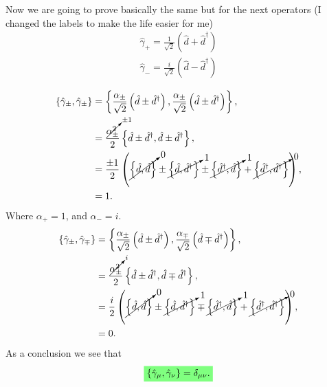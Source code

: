 \begin{questions}
\begin{solution}
  Now we are going to prove basically the same but for the next operators (I changed the labels to make the life easier for me)
  \begin{eqnarray}
    \hat{\gamma}_+ = \frac{1}{\sqrt{2}}\left(\hat{d} + \hat{d}^\dagger \right)\\
    \hat{\gamma}_- = \frac{i}{\sqrt{2}}\left(\hat{d} - \hat{d}^\dagger \right)
  \end{eqnarray}

  \begin{equation}
    \begin{aligned}[b]
      \{\hat{\gamma}_\pm,\hat{\gamma}_\pm \} &= \left\{\frac{\alpha_\pm}{\sqrt{2}}\left(\hat{d} \pm \hat{d}^\dagger \right),\frac{\alpha_\pm}{\sqrt{2}}\left(\hat{d} \pm \hat{d}^\dagger \right)\right\},\\
      &= \frac{\cancelto{\pm 1}{\alpha^2_\pm}}{2}\left\{\hat{d} \pm \hat{d}^\dagger ,\hat{d} \pm \hat{d}^\dagger \right\},\\
      &= \frac{\pm 1}{2}\left(\cancelto{0}{\left\{\hat{d} ,\hat{d} \right\}}  \pm \cancelto{1}{\left\{\hat{d}, \hat{d}^\dagger \right\}} \pm \cancelto{1}{\left\{  \hat{d}^\dagger ,\hat{d}\right\}} + \cancelto{0}{\left\{\hat{d}^\dagger ,\hat{d}^\dagger \right\}}\right),\\
      &= 1.
    \end{aligned}
  \end{equation}
  Where $\alpha_+ = 1$, and $\alpha_- = i$.
  \begin{equation}
    \begin{aligned}[b]
      \{\hat{\gamma}_\pm,\hat{\gamma}_\mp \} &= \left\{\frac{\alpha_\pm}{\sqrt{2}}\left(\hat{d} \pm \hat{d}^\dagger \right),\frac{\alpha_\mp}{\sqrt{2}}\left(\hat{d} \mp \hat{d}^\dagger \right)\right\},\\
      &= \frac{\cancelto{i}{\alpha^2_\pm}}{2}\left\{\hat{d} \pm \hat{d}^\dagger ,\hat{d} \mp \hat{d}^\dagger \right\},\\
      &= \frac{i}{2}\left(\cancelto{0}{\left\{\hat{d} ,\hat{d} \right\}}  \pm \cancelto{1}{\left\{\hat{d}, \hat{d}^\dagger \right\}} \mp \cancelto{1}{\left\{  \hat{d}^\dagger ,\hat{d}\right\}} + \cancelto{0}{\left\{\hat{d}^\dagger ,\hat{d}^\dagger \right\}}\right),\\
      &= 0.
    \end{aligned}
  \end{equation}
  As a conclusion we see that
  \begin{equation}
    \hlgreen{\{\hat{\gamma}_\mu , \hat{\gamma}_\nu\} = \delta_{\mu \nu}.}
    \label{commu}
  \end{equation}


\end{solution}
\end{questions}
